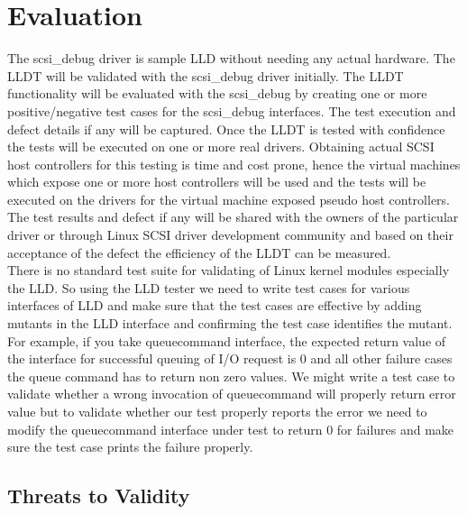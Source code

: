 \section{Evaluation}\vspace{3 mm}

\par The scsi\_debug driver is sample LLD without needing any actual hardware.  The LLDT will be validated with the scsi\_debug driver initially.  The LLDT functionality will be evaluated with the scsi\_debug by creating one or more positive/negative test cases for the scsi\_debug interfaces.  The test execution and defect details if any will be captured.  Once the LLDT is tested with confidence the tests will be executed on one or more real drivers. Obtaining actual SCSI host controllers for this testing is time and cost prone, hence the virtual machines which expose one or more host controllers will be used and the tests will be executed on the drivers for the virtual machine exposed pseudo host controllers.  \\

The test results and defect if any will be shared with the owners of the particular driver  or through  Linux SCSI driver development community and based on their acceptance of the defect the efficiency of the LLDT can be measured. \\

There is no standard test suite for validating of Linux kernel modules especially the LLD.  So using the LLD tester we need to write test cases for various interfaces of LLD and make sure that the test cases are effective by adding mutants in the LLD interface and confirming the test case identifies the mutant.\\

For example, if you take queuecommand interface, the expected return value of the interface for successful queuing of I/O request is 0 and all other failure cases the queue command has to return non zero values. We might write a test case to validate whether a wrong invocation of queuecommand will properly return error value but to validate whether our test properly reports the error we need to modify the queuecommand interface under test to return 0 for failures and make sure the test case prints the failure properly.\\

\subsection{Threats to Validity}

